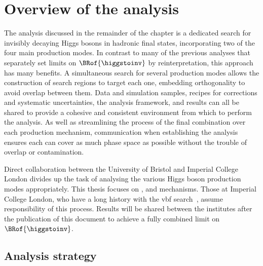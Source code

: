 \section{Overview of the analysis}
\label{sec:htoinv_analysis_overview}

The analysis discussed in the remainder of the chapter is a dedicated search for invisibly decaying Higgs bosons in hadronic final states, incorporating two of the four main production modes. In contrast to many of the previous analyses that separately set limits on $\BRof{\higgstoinv}$ by reinterpretation, this approach has many benefits. A simultaneous search for several production modes allows the construction of search regions to target each one, embedding orthogonality to avoid overlap between them. Data and simulation samples, recipes for corrections and systematic uncertainties, the analysis framework, and results can all be shared to provide a cohesive and consistent environment from which to perform the analysis. As well as streamlining the process of the final combination over each production mechanism, communication when establishing the analysis ensures each can cover as much phase space as possible without the trouble of overlap or contamination.

Direct collaboration between the University of Bristol and Imperial College London divides up the task of analysing the various Higgs boson production modes appropriately. This thesis focuses on \ttH, \VH and \ggH mechanisms. Those at Imperial College London, who have a long history with the \acrshort{vbf} search~\cite{Chatrchyan:2014tja,Sirunyan:2018owy}, assume responsibility of this process. Results will be shared between the institutes after the publication of this document to achieve a fully combined limit on $\BRof{\higgstoinv}$.




\subsection{Analysis strategy}
\label{subsec:htoinv_analysis_strategy}


